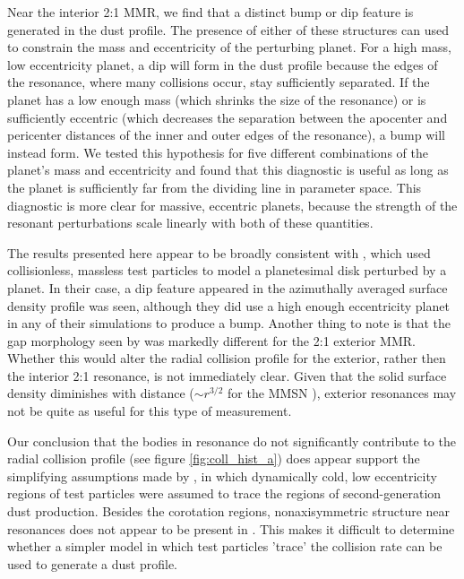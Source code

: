 \documentclass[onecolumn]{aastex63}
\begin{document}
Near the interior 2:1 MMR, we find that a distinct bump or dip feature is generated in the dust profile. The presence of either of these structures can used to constrain the mass and eccentricity of the perturbing planet. For a high mass, low eccentricity planet, a dip will form in the dust profile because the edges of the resonance, where many collisions occur, stay sufficiently separated. If the planet has a low enough mass (which shrinks the size of the resonance) or is sufficiently eccentric (which decreases the separation between the apocenter and pericenter distances of the inner and outer edges of the resonance), a bump will instead form. We tested this hypothesis for five different combinations of the planet's mass and eccentricity and found that this diagnostic is useful as long as the planet is sufficiently far from the dividing line in parameter space. This diagnostic is more clear for massive, eccentric planets, because the strength of the resonant perturbations scale linearly with both of these quantities.

The results presented here appear to be broadly consistent with \citet{2016ApJ...818..159T}, which used collisionless, massless test particles to model a planetesimal disk perturbed by a planet. In their case, a dip feature appeared in the azimuthally averaged surface density profile was seen, although they did use a high enough eccentricity planet in any of their simulations to produce a bump. Another thing to note is that the gap morphology seen by \citet{2016ApJ...818..159T} was markedly different for the 2:1 exterior MMR. Whether this would alter the radial collision profile for the exterior, rather then the interior 2:1 resonance, is not immediately clear.  Given that the solid surface density diminishes with distance ($\sim r^{3/2}$ for the MMSN \citep{1981PThPS..70...35H}), exterior resonances may not be quite as useful for this type of measurement.

Our conclusion that the bodies in resonance do not significantly contribute to the radial collision profile (see figure \ref{fig:coll_hist_a}) does appear support the simplifying assumptions made by \citet{2017ApJ...850..103B}, in which dynamically cold, low eccentricity regions of test particles were assumed to trace the regions of second-generation dust production. Besides the corotation regions, nonaxisymmetric structure near resonances does not appear to be present in \citet{2017ApJ...850..103B}. This makes it difficult to determine whether a simpler model in which test particles 'trace' the collision rate can be used to generate a dust profile.
\end{document}
